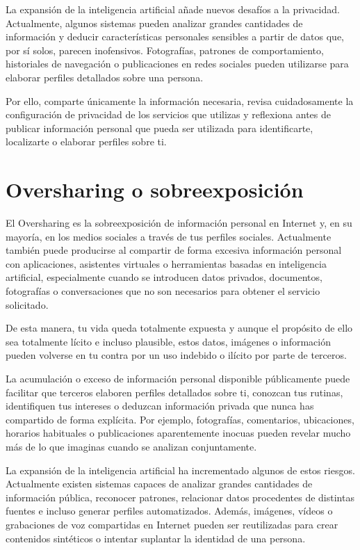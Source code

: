 \documentclass[
  spanish,
  a4paper,
  openany]{book}
\begin{document}
La expansión de la inteligencia artificial añade nuevos desafíos a la privacidad. Actualmente, algunos sistemas pueden analizar grandes cantidades de información y deducir características personales sensibles a partir de datos que, por sí solos, parecen inofensivos. Fotografías, patrones de comportamiento, historiales de navegación o publicaciones en redes sociales pueden utilizarse para elaborar perfiles detallados sobre una persona.

Por ello, comparte únicamente la información necesaria, revisa cuidadosamente la configuración de privacidad de los servicios que utilizas y reflexiona antes de publicar información personal que pueda ser utilizada para identificarte, localizarte o elaborar perfiles sobre ti.

\section{Oversharing o sobreexposición}\label{oversharing-o-sobreexposiciuxf3n}

El Oversharing es la sobreexposición de información personal en Internet y, en su mayoría, en los medios sociales a través de tus perfiles sociales. Actualmente también puede producirse al compartir de forma excesiva información personal con aplicaciones, asistentes virtuales o herramientas basadas en inteligencia artificial, especialmente cuando se introducen datos privados, documentos, fotografías o conversaciones que no son necesarios para obtener el servicio solicitado.

De esta manera, tu vida queda totalmente expuesta y aunque el propósito de ello sea totalmente lícito e incluso plausible, estos datos, imágenes o información pueden volverse en tu contra por un uso indebido o ilícito por parte de terceros.

La acumulación o exceso de información personal disponible públicamente puede facilitar que terceros elaboren perfiles detallados sobre ti, conozcan tus rutinas, identifiquen tus intereses o deduzcan información privada que nunca has compartido de forma explícita. Por ejemplo, fotografías, comentarios, ubicaciones, horarios habituales o publicaciones aparentemente inocuas pueden revelar mucho más de lo que imaginas cuando se analizan conjuntamente.

La expansión de la inteligencia artificial ha incrementado algunos de estos riesgos. Actualmente existen sistemas capaces de analizar grandes cantidades de información pública, reconocer patrones, relacionar datos procedentes de distintas fuentes e incluso generar perfiles automatizados. Además, imágenes, vídeos o grabaciones de voz compartidas en Internet pueden ser reutilizadas para crear contenidos sintéticos o intentar suplantar la identidad de una persona.
\end{document}
